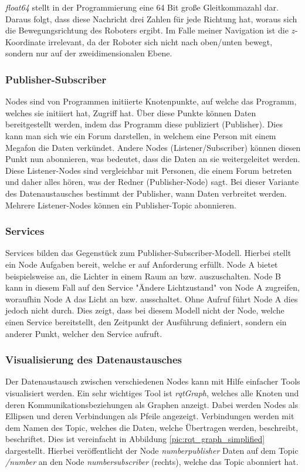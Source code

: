 {{{			\emph{float64} stellt in der Programmierung eine 64 Bit große Gleitkommazahl dar. Daraus folgt, dass diese Nachricht drei Zahlen für jede Richtung hat, woraus sich die Bewegungsrichtung des Roboters ergibt. Im Falle meiner Navigation ist die $z$-Koordinate irrelevant, da der Roboter sich nicht nach oben/unten bewegt, sondern nur auf der zweidimensionalen Ebene.
		}
		
		\subsubsection{Publisher-Subscriber}
		{
			Nodes sind von Programmen initiierte Knotenpunkte, auf welche das Programm, welches sie initiiert hat, Zugriff hat. Über diese Punkte können Daten bereitgestellt werden, indem das Programm diese publiziert (Publisher). Dies kann man sich wie ein Forum darstellen, in welchem eine Person mit einem Megafon die Daten verkündet. Andere Nodes (Listener/Subscriber) können diesen Punkt nun abonnieren, was bedeutet, dass die Daten an sie weitergeleitet werden. Diese Listener-Nodes sind vergleichbar mit Personen, die einem Forum betreten und daher alles hören, was der Redner (Publisher-Node) sagt. Bei dieser Variante des Datenaustausches bestimmt der Publisher, wann Daten verbreitet werden. Mehrere Listener-Nodes können ein Publisher-Topic abonnieren.
		}
		\subsubsection{Services}
		{ 
			Services bilden das Gegenstück zum Publisher-Subscriber-Modell. Hierbei stellt ein Node Aufgaben bereit, welche er auf Anforderung erfüllt. Node A bietet beispielsweise an, die Lichter in einem Raum an bzw. auszuschalten. Node B kann in diesem Fall auf den Service "Ändere Lichtzustand" von Node A zugreifen, woraufhin Node A das Licht an bzw. ausschaltet. Ohne Aufruf führt Node A dies jedoch nicht durch. Dies zeigt, dass bei diesem Modell nicht der Node, welche einen Service bereitstellt, den Zeitpunkt der Ausführung definiert, sondern ein anderer Punkt, welcher den Service aufruft.
		}
		
		\subsubsection{Visualisierung des Datenaustausches}
		{
			Der Datenaustausch zwischen verschiedenen Nodes kann mit Hilfe einfacher Tools visualisiert werden. Ein sehr wichtiges Tool ist \emph{rqt\textunderscore Graph}, welches alle Knoten und deren Kommunikationsbeziehungen als Graphen anzeigt. Dabei werden Nodes als Ellipsen und deren Verbindungen als Pfeile angezeigt. Verbindungen werden mit dem Namen des Topic, welches die Daten, welche Übertragen werden, beschreibt, beschriftet. Dies ist vereinfacht in Abbildung \ref{pic:rqt_graph_simplified} dargestellt. Hierbei veröffentlicht der Node \emph{number\textunderscore publisher} Daten auf dem Topic \emph{/number} an den Node \emph{number\textunderscore subscriber} (rechts), welche das Topic abonniert hat.
			
}}}
